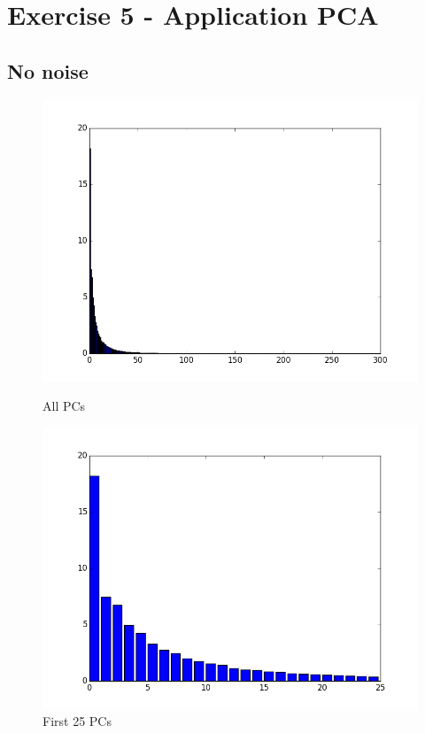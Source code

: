 \documentclass[a4paper,11pt]{article}
\begin{document}
\section*{Exercise 5 - Application PCA}


\subsection*{No noise}
\begin{figure}[H]
  \includegraphics[width=\linewidth]{5_b_a_00.png}
  \caption{All PCs}\label{fig:awesome_image1}
\endminipage\hfill
{}
  \includegraphics[width=\linewidth]{5_b_b_00.png}
  \caption{First 25 PCs}\label{fig:awesome_image2}

\end{figure}
\end{document}
